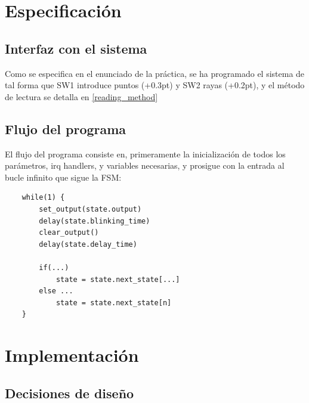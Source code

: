 \documentclass[a4paper,openright,12pt]{article}
\newcommand{\punto}{\kern+0.3pt\raisebox{0.35ex}{\huge\textbf.}}
\newcommand{\raya}{\kern+0.2pt\raisebox{-0.35ex}{\huge\textbf-}}
\begin{document}
\clearpage
\section{Especificación}
\subsection{Interfaz con el sistema}\label{design_button_translation}
Como se especifica en el enunciado de la práctica, se ha programado el sistema de tal forma que SW1 introduce puntos (\punto) y SW2 rayas (\raya), y el método de lectura se detalla en \ref{reading_method}

\subsection{Flujo del programa}
El flujo del programa consiste en, primeramente la inicialización de todos los parámetros, irq handlers, y variables necesarias, y prosigue con la entrada al bucle infinito que sigue la FSM:
\begin{verbatim}
    while(1) {
        set_output(state.output)
        delay(state.blinking_time)
        clear_output()
        delay(state.delay_time)
        
        if(...)
            state = state.next_state[...]
        else ...
            state = state.next_state[n]
    }
\end{verbatim}


\clearpage
\section{Implementación}
\subsection{Decisiones de diseño}
\end{document}
